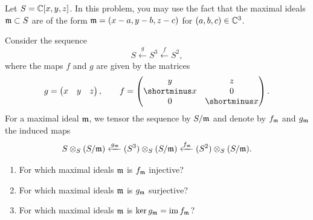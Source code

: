 \begin{question}[subtitle = {January 2023 Problem 3, notation altered},ID=Jan23_3]
Let $S = \mathbb{C}[x,y,z]$. In this problem, you may use the fact that the maximal ideals $\mathfrak{m} \subset S$ are of the form $\mathfrak{m} = (x-a,y-b,z-c)$ for $(a,b,c) \in \mathbb{C}^3$.

Consider the sequence
\[S \xleftarrow{g} S^3 \xleftarrow{f} S^2,\]
where the maps $f$ and $g$ are given by the matrices
\[g = \begin{pmatrix} x & y & z \end{pmatrix}, \qquad f = \begin{pmatrix} y & z\\ \shortminus x & 0\\ 0 & \shortminus x \end{pmatrix}.\]
For a maximal ideal $\mathfrak{m}$, we tensor the sequence by $S/\mathfrak{m}$ and denote by $f_{\mathfrak{m}}$ and $g_{\mathfrak{m}}$ the induced maps
\[S \otimes_S (S/\mathfrak{m}) \xleftarrow{g_{\mathfrak{m}}} (S^3) \otimes_S (S/\mathfrak{m}) \xleftarrow{f_{\mathfrak{m}}} (S^2) \otimes_S (S/\mathfrak{m}).\]
\begin{enumerate}
    \item For which maximal ideals $\mathfrak{m}$ is $f_{\mathfrak{m}}$ injective?
    \item For which maximal ideals $\mathfrak{m}$ is $g_{\mathfrak{m}}$ surjective?
    \item For which maximal ideals $\mathfrak{m}$ is $\ker g_{\mathfrak{m}} = \operatorname{im} f_{\mathfrak{m}}$?
\end{enumerate}
\end{question}
